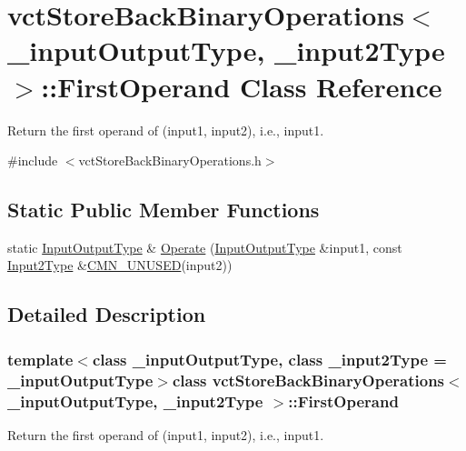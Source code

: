 \hypertarget{classvct_store_back_binary_operations_1_1_first_operand}{}\section{vct\+Store\+Back\+Binary\+Operations$<$ \+\_\+input\+Output\+Type, \+\_\+input2\+Type $>$\+:\+:First\+Operand Class Reference}
\label{classvct_store_back_binary_operations_1_1_first_operand}


Return the first operand of (input1, input2), i.\+e., input1.  




{\ttfamily \#include $<$vct\+Store\+Back\+Binary\+Operations.\+h$>$}

\subsection*{Static Public Member Functions}
\begin{DoxyCompactItemize}
\item 
static \hyperlink{classvct_store_back_binary_operations_a9dc481d9e1345541dd5d833d5e5688f3}{Input\+Output\+Type} \& \hyperlink{classvct_store_back_binary_operations_1_1_first_operand_abf06311ce7af31c4add9fcf5dafd72ca}{Operate} (\hyperlink{classvct_store_back_binary_operations_a9dc481d9e1345541dd5d833d5e5688f3}{Input\+Output\+Type} \&input1, const \hyperlink{classvct_store_back_binary_operations_a65a7197563c794a879fb50a406e70c8f}{Input2\+Type} \&\hyperlink{cmn_portability_8h_a021894e2626935fa2305434b1e893ff6}{C\+M\+N\+\_\+\+U\+N\+U\+S\+E\+D}(input2))
\end{DoxyCompactItemize}


\subsection{Detailed Description}
\subsubsection*{template$<$class \+\_\+input\+Output\+Type, class \+\_\+input2\+Type = \+\_\+input\+Output\+Type$>$class vct\+Store\+Back\+Binary\+Operations$<$ \+\_\+input\+Output\+Type, \+\_\+input2\+Type $>$\+::\+First\+Operand}

Return the first operand of (input1, input2), i.\+e., input1. 

